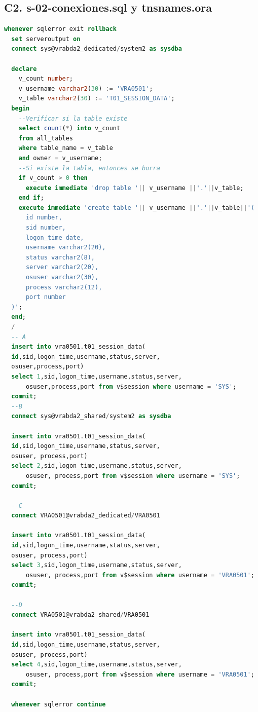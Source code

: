 \documentclass[journal]{IEEEtran}
\begin{document}
\subsection{C2. s-02-conexiones.sql y tnsnames.ora}

\begin{lstlisting}[language=sql, caption=s-02-conexiones.sql,label={lst:codigo3}]
  whenever sqlerror exit rollback
  set serveroutput on
  connect sys@vrabda2_dedicated/system2 as sysdba
  
  declare
    v_count number;
    v_username varchar2(30) := 'VRA0501';
    v_table varchar2(30) := 'T01_SESSION_DATA';
  begin
    --Verificar si la table existe
    select count(*) into v_count
    from all_tables
    where table_name = v_table
    and owner = v_username;
    --Si existe la tabla, entonces se borra
    if v_count > 0 then
      execute immediate 'drop table '|| v_username ||'.'||v_table;
    end if;
    execute immediate 'create table '|| v_username ||'.'||v_table||'(
      id number,
      sid number,
      logon_time date,
      username varchar2(20),
      status varchar2(8),
      server varchar2(20),
      osuser varchar2(30),
      process varchar2(12),
      port number
  )';
  end;
  /
  -- A
  insert into vra0501.t01_session_data(
  id,sid,logon_time,username,status,server,
  osuser,process,port)
  select 1,sid,logon_time,username,status,server,
      osuser,process,port from v$session where username = 'SYS';
  commit;
  --B
  connect sys@vrabda2_shared/system2 as sysdba
  
  insert into vra0501.t01_session_data(
  id,sid,logon_time,username,status,server,
  osuser, process,port) 
  select 2,sid,logon_time,username,status,server,
      osuser, process,port from v$session where username = 'SYS';
  commit;
  
  --C
  connect VRA0501@vrabda2_dedicated/VRA0501
  
  insert into vra0501.t01_session_data(
  id,sid,logon_time,username,status,server,
  osuser, process,port) 
  select 3,sid,logon_time,username,status,server,
      osuser, process,port from v$session where username = 'VRA0501';
  commit;
  
  --D
  connect VRA0501@vrabda2_shared/VRA0501
  
  insert into vra0501.t01_session_data(
  id,sid,logon_time,username,status,server,
  osuser, process,port) 
  select 4,sid,logon_time,username,status,server,
      osuser, process,port from v$session where username = 'VRA0501';
  commit;
  
  whenever sqlerror continue  
\end{lstlisting}
\end{document}
